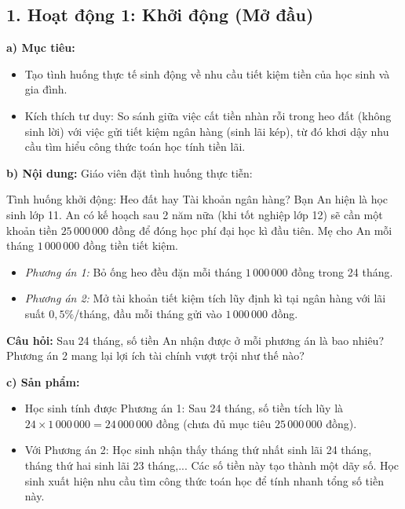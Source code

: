 \documentclass[12pt, a4paper]{article}
\begin{document}
\subsection*{1. Hoạt động 1: Khởi động (Mở đầu)}

\noindent \textbf{a) Mục tiêu:}
\begin{itemize}[leftmargin=0.6cm]
    \item Tạo tình huống thực tế sinh động về nhu cầu tiết kiệm tiền của học sinh và gia đình.
    \item Kích thích tư duy: So sánh giữa việc cất tiền nhàn rỗi trong heo đất (không sinh lời) với việc gửi tiết kiệm ngân hàng (sinh lãi kép), từ đó khơi dậy nhu cầu tìm hiểu công thức toán học tính tiền lãi.
\end{itemize}

\noindent \textbf{b) Nội dung:}
Giáo viên đặt tình huống thực tiễn:
\begin{pedabox}{Tình huống khởi động: Heo đất hay Tài khoản ngân hàng?}
    Bạn An hiện là học sinh lớp 11. An có kế hoạch sau 2 năm nữa (khi tốt nghiệp lớp 12) sẽ cần một khoản tiền $25\,000\,000$ đồng để đóng học phí đại học kì đầu tiên. Mẹ cho An mỗi tháng $1\,000\,000$ đồng tiền tiết kiệm.
    \begin{itemize}
        \item \textit{Phương án 1:} Bỏ ống heo đều đặn mỗi tháng $1\,000\,000$ đồng trong 24 tháng.
        \item \textit{Phương án 2:} Mở tài khoản tiết kiệm tích lũy định kì tại ngân hàng với lãi suất $0{,}5\%$/tháng, đầu mỗi tháng gửi vào $1\,000\,000$ đồng.
    \end{itemize}
    \textbf{Câu hỏi:} Sau 24 tháng, số tiền An nhận được ở mỗi phương án là bao nhiêu? Phương án 2 mang lại lợi ích tài chính vượt trội như thế nào?
\end{pedabox}

\noindent \textbf{c) Sản phẩm:}
\begin{itemize}
    \item Học sinh tính được Phương án 1: Sau 24 tháng, số tiền tích lũy là $24 \times 1\,000\,000 = 24\,000\,000$ đồng (chưa đủ mục tiêu $25\,000\,000$ đồng).
    \item Với Phương án 2: Học sinh nhận thấy tháng thứ nhất sinh lãi 24 tháng, tháng thứ hai sinh lãi 23 tháng,... Các số tiền này tạo thành một dãy số. Học sinh xuất hiện nhu cầu tìm công thức toán học để tính nhanh tổng số tiền này.
\end{itemize}
\end{document}
